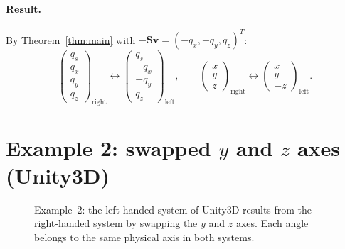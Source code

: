 \documentclass{article}
\theoremstyle{plain}
\theoremstyle{definition}
\newcommand{\vect}[1]{\boldsymbol{#1}}
\newcommand{\coordframe}[8]{%
  \begin{scope}[scale=1.5, x={#1}, y={#2}, z={#3}]
    \draw[axis] (0,0,0) -- (1.8,0,0) node[pos=1.07, black] {$x$};
    \draw[axis] (0,0,0) -- (0,1.8,0) node[pos=1.07, black] {$y$};
    \draw[axis] (0,0,0) -- (0,0,1.8) node[pos=1.07, black] {$z$};
    \draw[rot] plot[domain=35:315, smooth, samples=40, variable=\t]
      ({1.25}, {0.32*cos(\t)}, {0.32*sin(\t)});
    \draw[rot] plot[domain=35:315, smooth, samples=40, variable=\t]
      ({0.32*sin(\t)}, {1.25}, {0.32*cos(\t)});
    \draw[rot] plot[domain=35:315, smooth, samples=40, variable=\t]
      ({0.32*cos(\t)}, {0.32*sin(\t)}, {1.25});
    \node[angle] at ({1.25}, {0.6*cos(215)}, {0.6*sin(215)}) {#5};
    \node[angle] at ({0.6*sin(215)}, {1.25}, {0.6*cos(215)}) {#6};
    \node[angle] at ({0.6*cos(215)}, {0.6*sin(215)}, {1.25}) {#7};
  \end{scope}
  \node[font=\bfseries\small] at (1.4,#8) {#4};
}
\begin{document}
\paragraph{Result.} By Theorem~\ref{thm:main} with $-\vect S\vect v = (-q_x, -q_y, q_z)^T$:
\begin{equation}\label{eq:rule1}
  \begin{pmatrix} q_s \\ q_x \\ q_y \\ q_z \end{pmatrix}_{\!\text{right}}
  \longleftrightarrow
  \begin{pmatrix} q_s \\ -q_x \\ -q_y \\ q_z \end{pmatrix}_{\!\text{left}},
  \qquad
  \begin{pmatrix} x \\ y \\ z \end{pmatrix}_{\!\text{right}}
  \longleftrightarrow
  \begin{pmatrix} x \\ y \\ -z \end{pmatrix}_{\!\text{left}}.
\end{equation}

\section{Example 2: swapped \texorpdfstring{$y$}{y} and \texorpdfstring{$z$}{z} axes (Unity3D)}\label{sec:ex2}

\begin{figure}[H]
  \centering
  \caption{Example~2: the left-handed system of Unity3D results from the right-handed system by
  swapping the $y$ and $z$ axes. Each angle belongs to the same physical axis in both systems.}
  \label{fig:ex2}
\end{figure}
\end{document}
